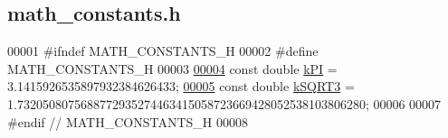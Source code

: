 \hypertarget{math__constants_8h_source}{}\subsection{math\+\_\+constants.\+h}
\label{math__constants_8h_source}

\begin{DoxyCode}
00001 \textcolor{preprocessor}{#ifndef MATH\_CONSTANTS\_H}
00002 \textcolor{preprocessor}{#define MATH\_CONSTANTS\_H}
00003 
\hypertarget{math__constants_8h_source_l00004}{}\hyperlink{math__constants_8h_a368d99984512d9a6c6f18b37b4446431}{00004} \textcolor{keyword}{const} \textcolor{keywordtype}{double} \hyperlink{math__constants_8h_a368d99984512d9a6c6f18b37b4446431}{kPI} = 3.1415926535897932384626433;
\hypertarget{math__constants_8h_source_l00005}{}\hyperlink{math__constants_8h_a987f07b0b550988e3f3f9fb36d74142e}{00005} \textcolor{keyword}{const} \textcolor{keywordtype}{double} \hyperlink{math__constants_8h_a987f07b0b550988e3f3f9fb36d74142e}{kSQRT3} = 1.7320508075688772935274463415058723669428052538103806280;
00006 
00007 \textcolor{preprocessor}{#endif // MATH\_CONSTANTS\_H}
00008 
\end{DoxyCode}
